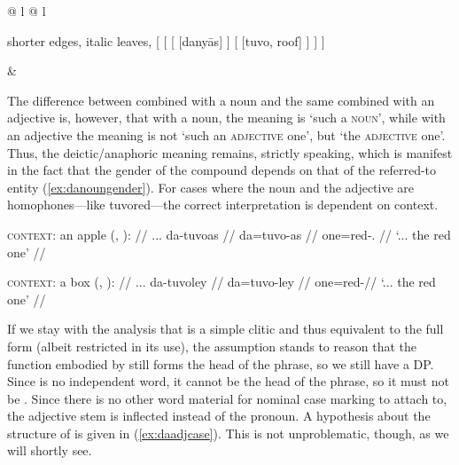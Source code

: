 \ex\label{ex:danyaastuvo} %
\begin{tabular}[t]{@{} l @{\quad} l}
\tl\quad\begin{forest} shorter edges, italic leaves,
[{}
	[\anno{\xbar{D}}
		[\anno{\xhead{D}}
			[danyās]
		]
		[{\anno[\elem{\Adjc}]{AP}}
			[{tuvo}, roof]
		]
	]
]
\end{forest}

&

\tl\quad\label{ex:danyaastuvoavm} 

\end{tabular}
\xe

The difference between  combined with a noun and the same
combined with an adjective is, however, that with a noun, the meaning is `such
a \textsc{noun}', while with an adjective the meaning is not `such an
\textsc{adjective} one', but `the \textsc{adjective} one'. Thus, the
deictic/anaphoric meaning remains, strictly speaking, which is manifest in the
fact that the gender of the compound depends on that of the referred-to entity
(\ref{ex:danoungender}). For cases where the noun and the adjective are
homophones---like  {tuvo}{red}---the correct interpretation is
dependent on context.

\pex\label{ex:danoungender}
\a\begingl
	\glpreamble \textsc{context:} an apple (, \An{}): //
	\gla ... da-tuvoas //
	\glb {} da=tuvo-as //
	\glc {} one=red-\Parg{}.\An{} //
	\glft `... the red one' // 
\endgl

\a\begingl
	\glpreamble \textsc{context:} a box (, \Inan{}): //
	\gla ... da-tuvoley //
	\glb {} da=tuvo-ley //
	\glc {} one=red-\PargI //
	\glft `... the red one' // 
\endgl
\xe

If we stay with the analysis that  is a simple clitic and thus
equivalent to the full form  (albeit restricted in its use),
the assumption stands to reason that the function embodied by 
still forms the head of the phrase, so we still have a DP. Since 
is no independent word, it cannot be the head of the phrase, so it must not be
. Since there is no other word material for nominal case marking to
attach to, the adjective stem is inflected instead of the pronoun. A hypothesis
about the structure of  is given in
(\ref{ex:daadjcase}). This is not unproblematic, though, as we will shortly
see.

